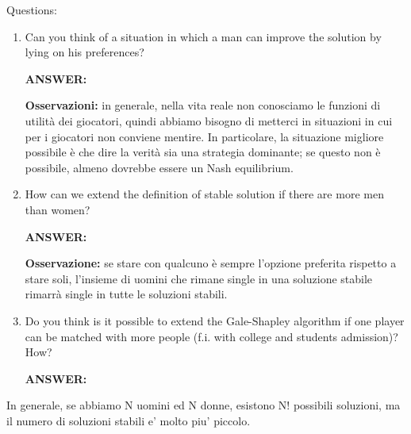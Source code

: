 
%



\noindent Questions:
\begin{enumerate}
	\item Can you think of a situation in which a man can improve 
		the solution by lying on his preferences?

		\noindent \textbf{ANSWER:} 

		\noindent \textbf{Osservazioni:} in generale, nella vita 
		reale non conosciamo le funzioni di utilità dei giocatori, 
		quindi abbiamo bisogno di metterci in situazioni in cui 
		per i giocatori non conviene mentire. In particolare, la 
		situazione migliore possibile è che dire la verità sia una 
		strategia dominante; se questo non è possibile, almeno 
		dovrebbe essere un Nash equilibrium.

	\item How can we extend the definition of stable solution if there 
		are more men than women?

		\noindent \textbf{ANSWER:} 

		\noindent \textbf{Osservazione:} se stare con qualcuno è 
		sempre l'opzione preferita rispetto a stare soli, l'insieme 
		di uomini che rimane single in una soluzione stabile 
		rimarrà single in tutte le soluzioni stabili.

	\item Do you think is it possible to extend the Gale-Shapley algorithm 
		if one player can be matched with more people (f.i. with 
		college and students admission)? How?

		\noindent \textbf{ANSWER:}
\end{enumerate}

\noindent In generale, se abbiamo N uomini ed N donne, esistono N! possibili 
soluzioni, ma il numero di soluzioni stabili e' molto piu' piccolo.

%
